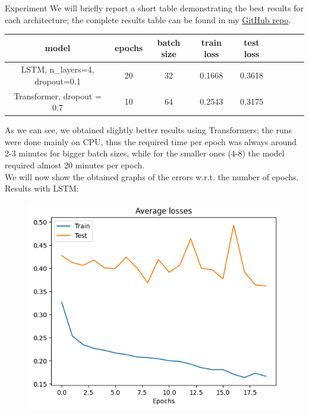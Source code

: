 \documentclass[aspectratio=169,t,xcolor=table]{beamer}
\begin{document}
\begin{frame}[allowframebreaks]{Experiment}
We will briefly report a short table demonstrating the best results for each architecture; the complete results table can be found in my \href{https://github.com/lorenzozanolin/StateEstimation}{GitHub repo}.%
\begin{table}[]
    \begin{tabular}{|c|c|c|c|c|c|c|c|c|}
    \hline
    \textbf{model} & \textbf{epochs} & \textbf{batch size} & \textbf{train loss} & \textbf{test loss} \\ \hline
    LSTM, n\_layers=4, dropout=0.1                                  & 20                                     & 32                                         & 0.1668              & 0.3618             \\ \hline
    Transformer, dropout = 0.7            & 10                                     & 64                                         & 0.2543               & 0.3175             \\ \hline
    \end{tabular}
    \end{table}
As we can see, we obtained slightly better results using Transformers; the runs were done mainly on CPU, thus the required time per epoch was always around 2-3 minutes for bigger batch sizes, while for the smaller ones (4-8) the model required almost 20 minutes per epoch.\\
\vspace{5mm}
We will now show the obtained graphs of the errors w.r.t. the number of epochs.\\
\vspace{4mm}
Results with LSTM:
\begin{figure}[!htb]
    \begin{center}
        \begin{minipage}{0.45\textwidth}
            \centering
            \includegraphics[width=\linewidth]{../outputs/lstmError.png}

\end{minipage}
\end{center}
\end{figure}
\end{frame}
\end{document}
